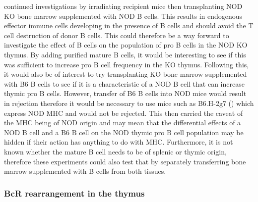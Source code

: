 \citet{Serreze1998} continued investigations by irradiating recipient mice then transplanting NOD KO bone marrow supplemented with NOD B cells.
This results in endogenous effector immune cells developing in the presence of B cells and should avoid the T cell destruction of donor B cells.
This could therefore be a way forward to investigate the effect of B cells on the population of pro B cells in the NOD KO thymus.
By adding purified mature B cells, it would be interesting to see if this was sufficient to increase pro B cell frequency in the KO thymus.
Following this, it would also be of interest to try transplanting KO bone marrow supplemented with B6 B cells to see if it is a characteristic of a NOD B cell that can increase thymic pro B cells.
However, transfer of B6 B cells into NOD mice would result in rejection therefore it would be necessary to use mice such as B6.H-2g7 (\citep{Gonzalez1997}) which express NOD MHC and would not be rejected. This then carried the caveat of the MHC being of NOD origin and may mean that the differential effects of a NOD B cell and a B6 B cell on the NOD thymic pro B cell population may be hidden if their action has anything to do with MHC.
Furthermore, it is not known whether the mature B cell needs to be of splenic or thymic origin, therefore these experiments could also test that by separately transferring bone marrow supplemented with B cells from both tissues.

\subsubsection{BcR rearrangement in the thymus}


